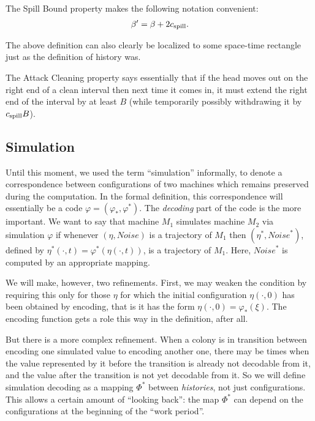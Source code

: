 \documentclass[12pt]{memoir}
\def\B{B}
\newcommand{\Noise}{\mathit{Noise}}
\newcommand{\cns}[1]{c_{\textrm{\upshape #1}}}
\newcommand{\CSpill}{\cns{spill}}
\begin{document}
The Spill Bound property makes the following notation convenient:
\begin{align}\label{eq:beta'}
   \beta'=\beta+2\CSpill.
 \end{align}


The above definition can also clearly be localized to some space-time
rectangle just as the definition of history was.

The Attack Cleaning property says essentially that if the head moves out on the right end
of a clean interval then next time it comes in, it must extend the right end of the interval 
by at least \( \B \) (while temporarily possibly withdrawing it by \( \CSpill\B \)).


\subsection{Simulation}

Until this moment, we used the term ``simulation'' informally, to denote
a correspondence between configurations of
two machines which remains preserved during the computation.
In the formal definition, this correspondence will essentially be a code
\( \varphi=(\varphi_{*},\varphi^{*}) \).
The \emph{decoding} part of the code is the more important.
We want to say that machine \( M_{1} \) simulates machine \( M_{2} \) via
simulation \( \varphi \) if whenever \( (\eta, \Noise) \) is a trajectory of \( M_{1} \) 
then \( (\eta^{*},\Noise^{*}) \),
defined by \( \eta^{*}(\cdot,t)=\varphi^{*}(\eta(\cdot,t)) \), is a
trajectory of \( M_{1} \).
Here, \( \Noise^{*} \) is computed by an appropriate mapping.

We will make, however, two refinements.
First, we may weaken the condition by requiring this only for
those \( \eta \) for which the initial configuration
 \( \eta(\cdot,0) \) has been obtained by encoding, that is it has the form 
\( \eta(\cdot,0)=\varphi_{*}(\xi) \).
The encoding function gets a role this way in the definition, after all.

But there is a more complex refinement.
When a colony is in transition between encoding one simulated value to encoding another one,
there may be times when the value represented by it before the transition
is already not decodable from it, and the value after the transition is not yet decodable from it.
So we will define simulation decoding as a mapping \( \Phi^{*} \)
between \emph{histories}, not just configurations.
This allows a certain amount of ``looking back'':
the map \( \Phi^{*} \) can depend on the configurations at the beginning of the ``work period''.
\end{document}
